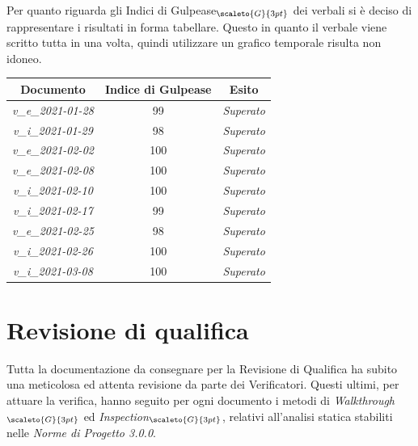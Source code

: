 {{{%

Per quanto riguarda gli Indici di Gulpease$_{\scaleto{G}{3pt}}$ dei verbali si è deciso di rappresentare i risultati in forma tabellare.
Questo in quanto il verbale viene scritto tutta in una volta, quindi utilizzare un grafico temporale risulta non idoneo.

\quad
\def\tabularxcolumn#1{m{#1}}
{
	\begin{center}
		\renewcommand{\arraystretch}{1.4}
		\begin{tabularx}{9.5cm}{|c|c|c|}
			\hline
			\rowcolor{airforceblue}
			\textbf{Documento} & \textbf{Indice di Gulpease} & \textbf{Esito}\\
			\hline
			\textit{v\_e\_2021-01-28} & 99 & \textit{Superato}\\
			\hline
			\textit{v\_i\_2021-01-29} & 98  & \textit{Superato}\\
			\hline
			\textit{v\_e\_2021-02-02} & 100 & \textit{Superato}\\
			\hline
			\textit{v\_e\_2021-02-08} & 100 & \textit{Superato}\\
			\hline
			\textit{v\_i\_2021-02-10} & 100 & \textit{Superato}\\
			\hline
			\textit{v\_i\_2021-02-17} & 99 & \textit{Superato}\\
			\hline
			\textit{v\_e\_2021-02-25} & 98 & \textit{Superato}\\
			\hline
			\textit{v\_i\_2021-02-26} & 100 & \textit{Superato}\\
			\hline

			\textit{v\_i\_2021-03-08} & 100 & \textit{Superato}\\
			\hline
		\end{tabularx}
	\end{center}

\section{Revisione di qualifica}\label{ResocontoAttivitàDiVerificaRevisioneDiQualifica}
Tutta la documentazione da consegnare per la Revisione di Qualifica ha subito una meticolosa ed attenta revisione da parte dei Verificatori. Questi ultimi, per attuare la verifica, hanno seguito per ogni documento i metodi di \textit{Walkthrough}$_{\scaleto{G}{3pt}}$ ed \textit{Inspection}$_{\scaleto{G}{3pt}}$, relativi all'analisi statica stabiliti nelle \textit{Norme di Progetto 3.0.0}.

}}}}
